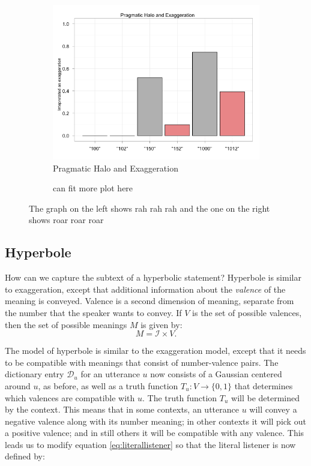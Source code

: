 \documentclass{article} %
\newcommand{\dictionary}{\ensuremath{\mathcal{D}}\xspace}
\begin{document}
\begin{figure}
        \begin{subfigure}[b]{0.5\textwidth}
                \centering
                \includegraphics[width=\textwidth]{model_halo_exaggeration.png}
		\caption{Pragmatic Halo and Exaggeration}
	\end{subfigure}
	 \begin{subfigure}[b]{0.33\textwidth}
                \centering
		\caption{can fit more plot here}
	\end{subfigure}
	\caption{The graph on the left shows rah rah rah and the one on the right shows roar roar roar}
\end{figure}

\subsection{Hyperbole}

How can we capture the subtext of a hyperbolic statement? Hyperbole is similar to exaggeration, except that additional information about the \emph{valence} of the meaning is conveyed. Valence is a second dimension of meaning, separate from the number that the speaker wants to convey. If $V$ is the set of possible valences, then the set of possible meanings $M$ is given by:
\begin{equation}
M = {\mathcal I} \times V.
\end{equation}

The model of hyperbole is similar to the exaggeration model, except that it needs to be compatible with meanings that consist of number-valence pairs. The dictionary entry $\dictionary_u$ for an utterance $u$ now consists of a Gaussian centered around $u$, as before, as well as a truth function $T_u:V\rightarrow \{0,1\}$ that determines which valences are compatible with $u$. The truth function $T_u$ will be determined by the context. This means that in some contexts, an utterance $u$ will convey a negative valence along with its number meaning; in other contexts it will pick out a positive valence; and in still others it will be compatible with any valence. This leads us to modify equation \ref{eq:literallistener} so that the literal listener is now defined by:
\end{document}
